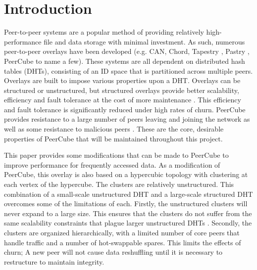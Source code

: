 \documentclass[apa6]{IEEEtran}
\theoremstyle{plain}
\begin{document}
%
\IEEEpeerreviewmaketitle



\section{Introduction}
Peer-to-peer systems are a popular method of providing relatively high-performance file and data storage with minimal investment. As such, numerous peer-to-peer overlays have been developed (e.g. CAN\cite{ratnasamy_scalable_2001}, Chord\cite{stoica_chord:_2001}, Tapestry \cite{zhao_tapestry:_2001}, Pastry \cite{rowstron_pastry:_2001}, PeerCube\cite{anceaume_peercube:_2008} to name a few). These systems are all dependent on distributed hash tables (DHTs), consisting of an ID space that is partitioned across multiple peers. Overlays are built to impose various properties upon a DHT. Overlays can be structured or unstructured, but structured overlays provide better scalability, efficiency and fault tolerance at the cost of more maintenance \cite{locher_equus:_2006}. This efficiency and fault tolerance is significantly reduced under high rates of churn. PeerCube provides resistance to a large number of peers leaving and joining the network as well as some resistance to malicious peers \cite{anceaume_peercube:_2008}. These are the core, desirable properties of PeerCube that will be maintained throughout this project.

This paper provides some modifications that can be made to PeerCube to improve performance for frequently accessed data. As a modification of PeerCube, this overlay is also based on a hypercubic topology with clustering at each vertex of the hypercube. The clusters are relatively unstructured. This combination of a small-scale unstructured DHT and a large-scale structured DHT overcomes some of the limitations of each. Firstly, the unstructured clusters will never expand to a large size. This ensures that the clusters do not suffer from the same scalability constraints that plague larger unstructured DHTs \cite{lua_survey_2005}. Secondly, the clusters are organized hierarchically, with a limited number of core peers that handle traffic and a number of hot-swappable spares. This limits the effects of churn; A new peer will not cause data reshuffling until it is necessary to restructure to maintain integrity.
\end{document}
